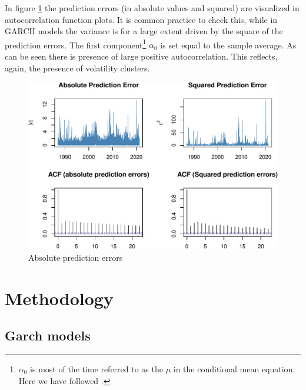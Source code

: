 \documentclass[a4paper, twoside]{templates/ociamthesis}
\begin{document}
\noindent In figure \ref{fig:acfplots} the prediction errors (in absolute values and squared) are visualized in autocorrelation function plots. It is common practice to check this, while in GARCH models the variance is for a large extent driven by the square of the prediction errors. The first component\footnote{\(\alpha_0\) is most of the time referred to as the \(\mu\) in the conditional mean equation. Here we have followed \textcite{bali2008}.} \(\alpha_0\) is set equal to the sample average. As can be seen there is presence of large positive autocorrelation. This reflects, again, the presence of volatility clusters.

\begin{figure}[h]

{\centering \includegraphics[width=1\linewidth]{_main_files/figure-latex/acfplots-1} 

}

\caption{Absolute prediction errors}\label{fig:acfplots}
\end{figure}

\clearpage

\hypertarget{methodology}{%
\section{Methodology}\label{methodology}}

\hypertarget{garch-method}{%
\subsection{Garch models}\label{garch-method}}
\end{document}
